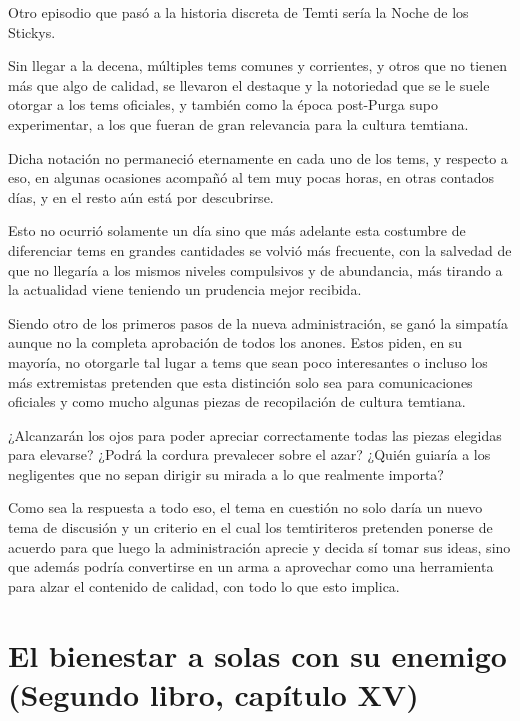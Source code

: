 \documentclass[
]{book}
\begin{document}
Otro episodio que pasó a la historia discreta de Temti sería la Noche de los Stickys.

Sin llegar a la decena, múltiples tems comunes y corrientes, y otros que no tienen más que algo de calidad, se llevaron el destaque y la notoriedad que se le suele otorgar a los tems oficiales, y también como la época post-Purga supo experimentar, a los que fueran de gran relevancia para la cultura temtiana.

Dicha notación no permaneció eternamente en cada uno de los tems, y respecto a eso, en algunas ocasiones acompañó al tem muy pocas horas, en otras contados días, y en el resto aún está por descubrirse.

Esto no ocurrió solamente un día sino que más adelante esta costumbre de diferenciar tems en grandes cantidades se volvió más frecuente, con la salvedad de que no llegaría a los mismos niveles compulsivos y de abundancia, más tirando a la actualidad viene teniendo un prudencia mejor recibida.

Siendo otro de los primeros pasos de la nueva administración, se ganó la simpatía aunque no la completa aprobación de todos los anones. Estos piden, en su mayoría, no otorgarle tal lugar a tems que sean poco interesantes o incluso los más extremistas pretenden que esta distinción solo sea para comunicaciones oficiales y como mucho algunas piezas de recopilación de cultura temtiana.

¿Alcanzarán los ojos para poder apreciar correctamente todas las piezas elegidas para elevarse? ¿Podrá la cordura prevalecer sobre el azar? ¿Quién guiaría a los negligentes que no sepan dirigir su mirada a lo que realmente importa?

Como sea la respuesta a todo eso, el tema en cuestión no solo daría un nuevo tema de discusión y un criterio en el cual los temtiriteros pretenden ponerse de acuerdo para que luego la administración aprecie y decida sí tomar sus ideas, sino que además podría convertirse en un arma a aprovechar como una herramienta para alzar el contenido de calidad, con todo lo que esto implica.

\hypertarget{el-bienestar-a-solas-con-su-enemigo-segundo-libro-capuxedtulo-xv}{%
\section{El bienestar a solas con su enemigo (Segundo libro, capítulo XV)}\label{el-bienestar-a-solas-con-su-enemigo-segundo-libro-capuxedtulo-xv}}
\end{document}
